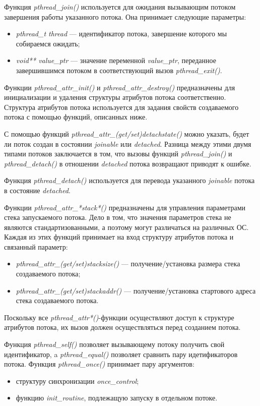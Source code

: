 Функция \textit{pthread\_join()} используется для ожидания вызывающим потоком
завершения работы указанного потока. Она принимает следующие параметры:
\begin{itemize}
  \item \textit{pthread\_t thread} --- идентификатор потока,
    завершение которого мы собираемся ожидать;
  \item \textit{void** value\_ptr} --- значение переменной \textit{value\_ptr},
    переданное завершившимся потоком в соответствующий вызов \textit{pthread\_exit()}.
\end{itemize}

Функции \textit{pthread\_attr\_init()} и \textit{pthread\_attr\_destroy()}
предназначены для инициализации и удаления структуры атрибутов
потока соответственно. Структура атрибутов потока используется для
задания свойств создаваемого потока с помощью функций, описанных ниже.

С помощью функций \textit{pthread\_attr\_(get/set)detachstate()} можно указать,
будет ли поток создан в состоянии \textit{joinable} или \textit{detached}.
Разница между этими двумя типами потоков заключается в том,
что вызовы функций \textit{pthread\_join()} и \textit{pthread\_detach()}
в отношении \textit{detached} потока возвращают приводят к ошибке.

Функция \textit{pthread\_detach()} используется для перевода указанного \textit{joinable}
потока в состояние \textit{detached}.

Функции \textit{pthread\_attr\_*stack*()} предназначены для управления
параметрами стека запускаемого потока. Дело в том, что значения параметров стека
не являются стандартизованными, а поэтому могут различаться на различных ОС.
Каждая из этих функций принимает на вход структуру атрибутов потока и связанный параметр:
\begin{itemize}
  \item \textit{pthread\_attr\_(get/set)stacksize()} --- получение/установка размера стека
    создаваемого потока;
  \item \textit{pthread\_attr\_(get/set)stackaddr()} --- получение/установка стартового адреса
    стека создаваемого потока.
\end{itemize}

Поскольку все \textit{pthread\_attr*()}-функции осуществляют доступ к структуре
атрибутов потока, их вызов должен осуществляться перед созданием потока.

Функция \textit{pthread\_self()} позволяет вызывающему потоку получить свой идентификатор,
a \textit{pthread\_equal()} позволяет сравнить пару идетификаторов потока.
Функция \textit{pthread\_once()} принимает пару аргументов:
\begin{itemize}
  \item структуру синхронизации \textit{once\_control};
  \item функцию \textit{init\_routine}, подлежащую запуску в отдельном потоке.
\end{itemize}

